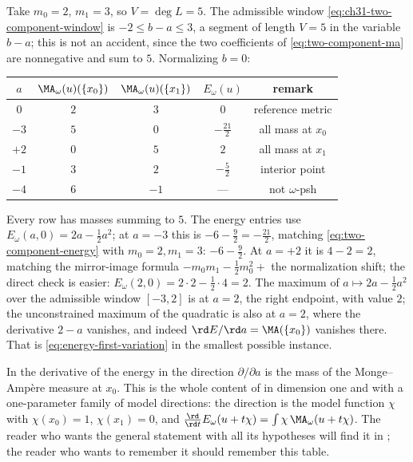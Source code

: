 \begin{example}
\label{ex:ch31-two-component-numbers}
Take \(m_0=2\), \(m_1=3\), so \(V=\deg L=5\).  The admissible window
\eqref{eq:ch31-two-component-window} is \(-2\leq b-a\leq3\), a segment of
length \(V=5\) in the variable \(b-a\); this is not an accident, since the
two coefficients of \eqref{eq:two-component-ma} are nonnegative and sum to
\(5\).  Normalizing \(b=0\):
\begin{center}
\small
\begin{tabular}{c|c|c|c|c}
\toprule
\(a\)&\(\MA_\omega(u)(\{x_0\})\)&\(\MA_\omega(u)(\{x_1\})\)
 &\(E_\omega(u)\)&remark\\
\midrule
\(0\)&\(2\)&\(3\)&\(0\)&reference metric\\
\(-3\)&\(5\)&\(0\)&\(-\tfrac{21}2\)&all mass at \(x_0\)\\
\(+2\)&\(0\)&\(5\)&\(2\)&all mass at \(x_1\)\\
\(-1\)&\(3\)&\(2\)&\(-\tfrac52\)&interior point\\
\(-4\)&\(6\)&\(-1\)&---&not \(\omega\)-psh\\
\bottomrule
\end{tabular}
\end{center}
Every row has masses summing to \(5\).  The energy entries use
\(E_\omega(a,0)=2a-\tfrac12a^2\); at \(a=-3\) this is
\(-6-\tfrac92=-\tfrac{21}2\), matching \eqref{eq:two-component-energy} with
\(m_0=2,m_1=3\): \(-6-\tfrac92\).  At \(a=+2\) it is \(4-2=2\), matching the
mirror-image formula \(-m_0m_1-\tfrac12m_0^2+\) the normalization shift; the
direct check is easier: \(E_\omega(2,0)=2\cdot2-\tfrac12\cdot4=2\).  The
maximum of \(a\mapsto2a-\tfrac12a^2\) over the admissible window
\([-3,2]\) is at \(a=2\), the right endpoint, with value \(2\); the
unconstrained maximum of the quadratic is also at \(a=2\), where the
derivative \(2-a\) vanishes, and indeed \(\rd E/\rd a=\MA(\{x_0\})\)
vanishes there.  That is
\eqref{eq:energy-first-variation} in the smallest possible instance.
\end{example}

\begin{remark}
\label{rem:ch31-two-component-derivative}
In  the derivative of the energy in the
direction \(\partial/\partial a\) is the mass of the Monge--Amp\`ere measure
at \(x_0\).  This is the whole content of
 in dimension one and with a
one-parameter family of model directions: the direction is the model
function \(\chi\) with \(\chi(x_0)=1\), \(\chi(x_1)=0\), and
\(\frac{\rd}{\rd t}E_\omega(u+t\chi)=\int\chi\,\MA_\omega(u+t\chi)\).
The reader who wants the general statement with all its hypotheses will
find it in ; the reader who wants to remember it
should remember this table.
\end{remark}

